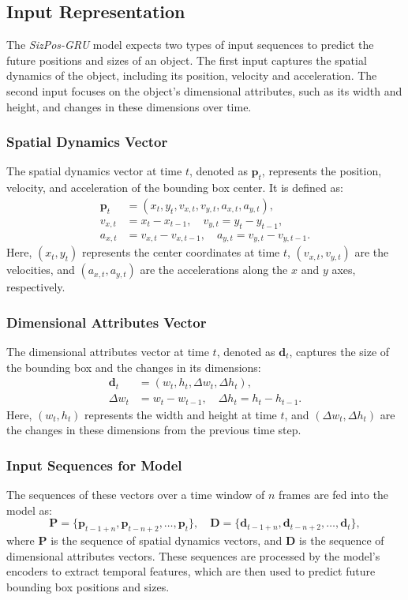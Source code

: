 \documentclass[12pt,oneside]{book} %
\begin{document}
\newpage
\subsection{Input Representation}
The \textit{SizPos-GRU} model expects two types of input sequences to predict
the future positions and sizes of an object. The first input captures the
spatial dynamics of the object, including its position, velocity and
acceleration. The second input focuses on the object's dimensional attributes,
such as its width and height, and changes in these dimensions over time.

\subsubsection*{Spatial Dynamics Vector}
The spatial dynamics vector at time $t$, denoted as $\mathbf{p}_t$, represents the position, velocity, and acceleration of the bounding box center. It is defined as:
\begin{align}
    \mathbf{p}_t & = \left(x_t, y_t, v_{x,t}, v_{y,t}, a_{x,t}, a_{y,t}\right), \\
    v_{x,t}      & = x_t - x_{t-1}, \quad v_{y,t} = y_t - y_{t-1},              \\
    a_{x,t}      & = v_{x,t} - v_{x,t-1}, \quad a_{y,t} = v_{y,t} - v_{y,t-1}.
\end{align}
Here, $(x_t, y_t)$ represents the center coordinates at time $t$, $(v_{x,t}, v_{y,t})$ are the velocities, and $(a_{x,t}, a_{y,t})$ are the accelerations along the $x$ and $y$ axes, respectively.

\subsubsection*{Dimensional Attributes Vector}
The dimensional attributes vector at time $t$, denoted as $\mathbf{d}_t$, captures the size of the bounding box and the changes in its dimensions:
\begin{align}
    \mathbf{d}_t & = \left(w_t, h_t, \Delta w_t, \Delta h_t\right),    \\
    \Delta w_t   & = w_t - w_{t-1}, \quad \Delta h_t = h_t - h_{t-1}.
\end{align}
Here, $(w_t, h_t)$ represents the width and height at time $t$, and $(\Delta w_t, \Delta h_t)$ are the changes in these dimensions from the previous time step.

\subsubsection*{Input Sequences for Model}
The sequences of these vectors over a time window of \(n\) frames are fed into the model as:
\[
    \mathbf{P} = \{\mathbf{p}_{t-1+n}, \mathbf{p}_{t-n+2}, \dots, \mathbf{p}_t\}, \quad \mathbf{D} = \{\mathbf{d}_{t-1+n}, \mathbf{d}_{t-n+2}, \dots, \mathbf{d}_t\},
\]
where $\mathbf{P}$ is the sequence of spatial dynamics vectors, and
$\mathbf{D}$ is the sequence of dimensional attributes vectors. These sequences
are processed by the model's encoders to extract temporal features, which are
then used to predict future bounding box positions and sizes.
\end{document}
